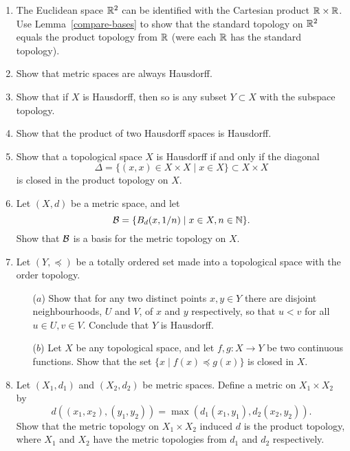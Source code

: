 \begin{enumerate}
  \item The Euclidean space $\mathbb{R}^2$ can be identified with the Cartesian product $\mathbb{R} \times \mathbb{R}$. Use Lemma~\ref{compare-bases} to show that the standard topology on $\mathbb{R}^2$ equals the product topology from $\mathbb{R}$ (were each $\mathbb{R}$ has the standard topology).
  

  \item \label{metric-Hausdorff} Show that metric spaces are always Hausdorff.
  
  \item Show that if $X$ is Hausdorff, then so is any subset $Y\subset X$ with the subspace topology.
  
  \item Show that the product of two Hausdorff spaces is Hausdorff.
  
  \item Show that a topological space $X$ is Hausdorff if and only if the diagonal
  \[
    \Delta = \{(x,x) \in X \times X \mid x \in X \} \subset X \times X
  \]
  is closed in the product topology on $X$.
  
  \item \label{metric-first-countable} Let $(X,d)$ be a metric space, and let
  \[
    \mathcal{B} = \{ B_d(x,1/n) \mid x \in X, n \in \mathbb{N} \}.
  \]
  Show that $\mathcal{B}$ is a basis for the metric topology on $X$.
  
  \item Let $(Y,\preceq)$ be a totally ordered set made into a topological space with the order topology.
  \begin{itemize}
    \item[($a$)] Show that for any two distinct points $x, y \in Y$ there are disjoint neighbourhoods, $U$ and $V$, of $x$ and $y$ respectively, so that $u < v$ for all $u \in U, v \in V$. Conclude that $Y$ is Hausdorff.
    \item[($b$)] Let $X$ be any topological space, and let $f,g:X\to Y$ be two continuous functions. Show that the set $\{x \mid f(x)\preceq g(x)\}$ is closed in $X$.
  \end{itemize}
  
  \item Let $(X_1,d_1)$ and $(X_2,d_2)$ be metric spaces. Define a metric on $X_1 \times X_2$ by
	\[
	  d((x_1,x_2),(y_1,y_2)) = \max(d_1(x_1,y_1),d_2(x_2,y_2)).
  \]
  Show that the metric topology on $X_1 \times X_2$ induced $d$ is the product topology, where $X_1$ and $X_2$ have the metric topologies from $d_1$ and $d_2$ respectively.


\end{enumerate}
